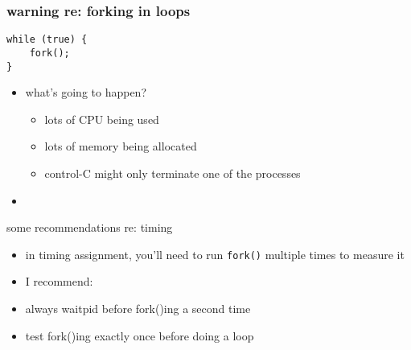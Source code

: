 \begin{FragileFrame}\frametitle{warning re: forking in loops}
\lstset{language=C,style=smaller}
\begin{lstlisting}
while (true) {
    fork();
}
\end{lstlisting}
    \begin{itemize}
    \item what's going to happen?
        \begin{itemize}
        \item lots of CPU being used
        \item lots of memory being allocated
        \item control-C might only terminate one of the processes
        \end{itemize}
    \item<2-> 
    \end{itemize}
\end{FragileFrame}

\begin{frame}{some recommendations re: timing}
    \begin{itemize}
    \item in timing assignment, you'll need to run \texttt{fork()} multiple times to measure it
    \vspace{.5cm}
    \item I recommend:
    \item always waitpid  before fork()ing a second time
    \item test fork()ing exactly once before doing a loop
    \end{itemize}
\end{frame}

